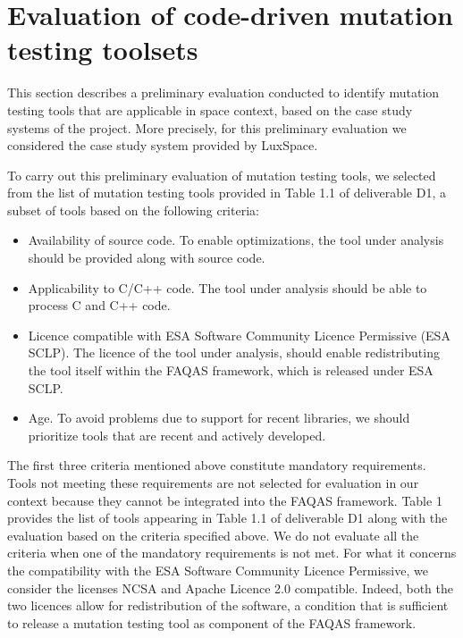 
\section{Evaluation of code-driven mutation testing toolsets}


This section describes a preliminary evaluation conducted to identify mutation testing tools that are applicable in space context, based on the case study systems of the project. More precisely, for this preliminary evaluation we considered the case study system provided by LuxSpace.

To carry out this preliminary evaluation of mutation testing tools, we selected from the list of mutation testing tools provided in Table 1.1 of deliverable D1, a subset of tools based on the following criteria:

\begin{itemize}
	\item Availability of source code. To enable optimizations, the tool under analysis should be provided along with source code.
	\item Applicability to C/C++ code. The tool under analysis should be able to process C and C++ code.
	\item Licence compatible with ESA Software Community Licence Permissive (ESA SCLP). The licence of the tool under analysis, should enable redistributing the tool itself within the FAQAS framework, which is released under ESA SCLP.
	\item Age. To avoid problems due to support for recent libraries, we should prioritize tools that are recent and actively developed.
\end{itemize}




The first three criteria mentioned above constitute mandatory requirements. 
Tools not meeting these requirements are not selected for evaluation in our context because they cannot be integrated into the FAQAS framework.
Table 1 provides the list of tools appearing in Table 1.1 of deliverable D1 along with the evaluation based on the criteria specified above. We do not evaluate all the criteria when one of the mandatory requirements is not met.
For what it concerns the compatibility with the ESA Software Community Licence Permissive, we consider the licenses NCSA and Apache Licence 2.0 compatible. 
Indeed, both the two licences allow for redistribution of the software, a condition that is sufficient to release a mutation testing tool as component of the FAQAS framework.

